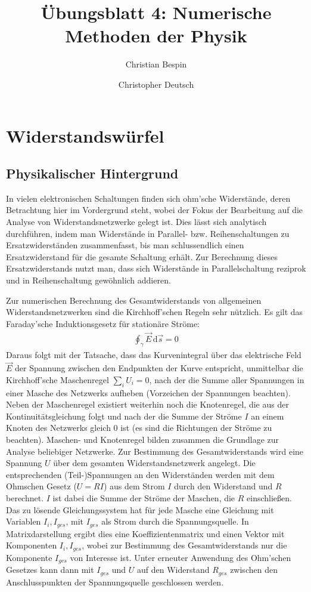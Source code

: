 \documentclass[10pt,a4paper]{article}
\author{Christian Bespin \and Christopher Deutsch}
\title{Übungsblatt 4: Numerische Methoden der Physik}
\begin{document}
\maketitle

\setcounter{section}{3}

\section{Widerstandswürfel}

\subsection{Physikalischer Hintergrund}

In vielen elektronischen Schaltungen finden sich ohm'sche Widerstände, deren Betrachtung hier im Vordergrund steht, wobei der Fokus der Bearbeitung auf die Analyse von Widerstandsnetzwerke gelegt ist. Dies lässt sich analytisch durchführen, indem man Widerstände in Parallel- bzw. Reihenschaltungen zu Ersatzwiderständen zusammenfasst, bis man schlussendlich einen Ersatzwiderstand für die gesamte Schaltung erhält. Zur Berechnung dieses Ersatzwiderstands nutzt man, dass sich Widerstände in Parallelschaltung reziprok und in Reihenschaltung gewöhnlich addieren.

Zur numerischen Berechnung des Gesamtwiderstands von allgemeinen Widerstandsnetzwerken sind die Kirchhoff'schen Regeln sehr nützlich. Es gilt das Faraday'sche Induktionsgesetz für stationäre Ströme:
\begin{align}
\oint_{\gamma} \vec{E}\,\mathrm{d}\vec{s} = 0
\end{align}
Daraus folgt mit der Tatsache, dass das Kurvenintegral über das elektrische Feld $\vec{E}$ der Spannung zwischen den Endpunkten der Kurve entspricht, unmittelbar die Kirchhoff'sche Maschenregel $\sum_i U_i=0$, nach der die Summe aller Spannungen in einer Masche des Netzwerks aufheben (Vorzeichen der Spannungen beachten).
Neben der Maschenregel existiert weiterhin noch die Knotenregel, die aus der Kontinuitätsgleichung folgt und nach der die Summe der Ströme $I$ an einem Knoten des Netzwerks gleich $0$ ist (es sind die Richtungen der Ströme zu beachten). Maschen- und Knotenregel bilden zusammen die Grundlage zur Analyse beliebiger Netzwerke.
Zur Bestimmung des Gesamtwiderstands wird eine Spannung $U$ über dem gesamten Widerstandsnetzwerk angelegt. Die entsprechenden (Teil-)Spannungen an den Widerständen werden mit dem Ohmschen Gesetz ($U=R I$) aus dem Strom $I$ durch den Widerstand und $R$ berechnet. $I$ ist dabei die Summe der Ströme der Maschen, die $R$ einschließen. Das zu lösende Gleichungssystem hat für jede Masche eine Gleichung mit Variablen $I_i, I_{ges}$, mit $I_{ges}$ als Strom durch die Spannungsquelle. In Matrixdarstellung ergibt dies eine Koeffizientenmatrix und einen Vektor mit Komponenten $I_i, I_{ges}$, wobei zur Bestimmung des Gesamtwiderstands nur die Komponente $I_{ges}$ von Interesse ist. Unter erneuter Anwendung des Ohm'schen Gesetzes kann dann mit $I_{ges}$ und $U$ auf den Widerstand $R_{ges}$ zwischen den Anschlusspunkten der Spannungsquelle geschlossen werden.
\end{document}
